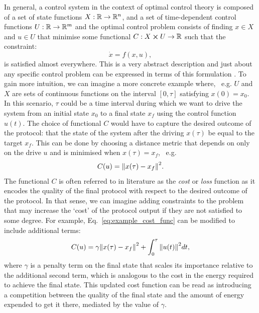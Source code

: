 In general, a control system in the context of optimal control theory is composed of a set of state functions $X: \mathbb{R} \rightarrow \mathbb{R}^n$, and a set of time-dependent control functions $U:\mathbb{R} \rightarrow \mathbb{R}^m$ and the optimal control problem consists of finding $x \in X$ and $u \in U$ that minimise some functional $C: X \cross U \rightarrow \mathbb{R}$ such that the constraint:
\begin{equation}\label{eq:control_ODE}
    \dot{x} = f(x, u),
\end{equation}
is satisfied almost everywhere. This is a very abstract description and just about any specific control problem can be expressed in terms of this formulation \cite{dalessandro_introduction_2021}. To gain more intuition, we can imagine a more concrete example where, \@~e.g. $U$ and $X$ are sets of continuous functions on the interval $[0, \tau]$ satisfying $x(0) = x_0$. In this scenario, $\tau$ could be a time interval during which we want to drive the system from an initial state $x_0$ to a final state $x_f$ using the control function $u(t)$. The choice of functional $C$ would have to capture the desired outcome of the protocol: that the state of the system after the driving $x(\tau)$ be equal to the target $x_f$. This can be done by choosing a distance metric that depends on only on the drive $u$ and is minimised when $x(\tau) = x_f$, \@~e.g.
\begin{equation}\label{eq:example_cost_func}
    C(u) = \norm{x(\tau)  - x_f}^2.
\end{equation}
The functional $C$ is often referred to in literature as the \emph{cost} or \emph{loss} function \cite{wald_statistical_1950} as it encodes the quality of the final protocol with respect to the desired outcome of the protocol. In that sense, we can imagine adding constraints to the problem that may increase the `cost' of the protocol output if they are not satisfied to some degree. For example, Eq.~\eqref{eq:example_cost_func} can be modified to include additional terms:
\begin{equation}\label{eq:example_cost_func2}
    C(u) = \gamma \norm{x(\tau)  - x_f}^2 + \int_0^{\tau} \norm{u(t)}^2 dt,
\end{equation}
where $\gamma$ is a penalty term on the final state that scales its importance relative to the additional second term, which is analogous to the cost in the energy required to achieve the final state. This updated cost function can be read as introducing a competition between the quality of the final state and the amount of energy expended to get it there, mediated by the value of $\gamma$. 

